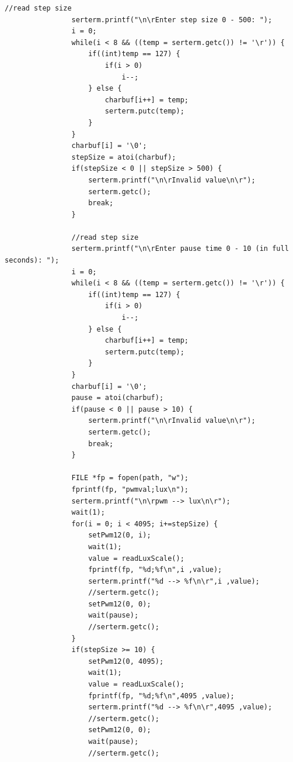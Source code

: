\documentclass[a4paper,12pt]{scrartcl}
\begin{document}
\begin{lstlisting}[captionpos=b, caption=MBED-Programmcode für den Messaufbau, label=messprogkomplett]
                //read step size
                serterm.printf("\n\rEnter step size 0 - 500: ");
                i = 0;
                while(i < 8 && ((temp = serterm.getc()) != '\r')) {
                    if((int)temp == 127) {
                        if(i > 0)
                            i--;
                    } else {
                        charbuf[i++] = temp;
                        serterm.putc(temp);
                    }
                }
                charbuf[i] = '\0';
                stepSize = atoi(charbuf);
                if(stepSize < 0 || stepSize > 500) {
                    serterm.printf("\n\rInvalid value\n\r");
                    serterm.getc();
                    break;
                }

                //read step size
                serterm.printf("\n\rEnter pause time 0 - 10 (in full seconds): ");
                i = 0;
                while(i < 8 && ((temp = serterm.getc()) != '\r')) {
                    if((int)temp == 127) {
                        if(i > 0)
                            i--;
                    } else {
                        charbuf[i++] = temp;
                        serterm.putc(temp);
                    }
                }
                charbuf[i] = '\0';
                pause = atoi(charbuf);
                if(pause < 0 || pause > 10) {
                    serterm.printf("\n\rInvalid value\n\r");
                    serterm.getc();
                    break;
                }

                FILE *fp = fopen(path, "w");
                fprintf(fp, "pwmval;lux\n");
                serterm.printf("\n\rpwm --> lux\n\r");
                wait(1);
                for(i = 0; i < 4095; i+=stepSize) {
                    setPwm12(0, i);
                    wait(1);
                    value = readLuxScale();
                    fprintf(fp, "%d;%f\n",i ,value);
                    serterm.printf("%d --> %f\n\r",i ,value);
                    //serterm.getc();
                    setPwm12(0, 0);
                    wait(pause);
                    //serterm.getc();
                }
                if(stepSize >= 10) {
                    setPwm12(0, 4095);
                    wait(1);
                    value = readLuxScale();
                    fprintf(fp, "%d;%f\n",4095 ,value);
                    serterm.printf("%d --> %f\n\r",4095 ,value);
                    //serterm.getc();
                    setPwm12(0, 0);
                    wait(pause);
                    //serterm.getc();


\end{lstlisting}
\end{document}
